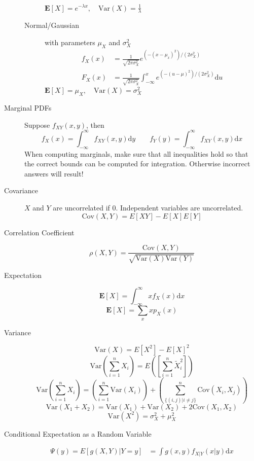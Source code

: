 \documentclass[8pt]{article}
\newcommand{\dd}[1]{\mathrm{d}{#1}}
\begin{document}
\begin{multicols}{2}
\begin{description}
\begin{description}
      $\mathbf{E}[X]=e^{-\lambda x},\quad\text{Var}(X)=\frac{1}{\lambda}$
    \item[Normal/Gaussian] with parameters $\mu_X$ and $\sigma_X^2$
      \begin{equation*}
        \begin{aligned}
          f_X(x) &=
          \frac{1}{\sqrt{2\pi\sigma_X^2}}e^{(-(x-\mu_x)^2)/(2\sigma_X^2)}
          \\
          F_X(x) &= \frac{1}{\sqrt{2\pi\sigma_X^2}} \int_{-\infty}^{x}
          e^{(-(u-\mu)^2)/(2\sigma_X^2)} \dd{u}
        \end{aligned}
    \end{equation*}
    $\mathbf{E}[X]=\mu_X,\quad\text{Var}(X)=\sigma_X^2$
  \end{description}
\item[Marginal PDFs] Suppose $f_{XY}(x,y)$, then
  $$f_X(x) = \int_{-\infty}^{\infty}f_{XY}(x,y)\dd{y} \quad\quad
  f_Y(y) = \int_{-\infty}^{\infty}f_{XY}(x,y)\dd{x}$$ When computing
  marginals, make sure that all inequalities hold so that the correct
  bounds can be computed for integration. Otherwise incorrect answers
  will result!
\item[Covariance] $X$ and $Y$ are uncorrelated if 0. Independent
  variables are uncorrelated.
  $$\text{Cov}(X,Y)=E[XY]-E[X]E[Y]$$
\item[Correlation Coefficient]
  $$\rho(X,Y)=\frac{\text{Cov}(X,Y)}{\sqrt{\text{Var}(X)\text{Var}(Y)}}$$
\item[Expectation] $$\mathbf{E}[X] = \int_{-\infty}^{\infty} x f_X(x)
  \dd{x}$$
  $$\mathbf{E}[X] = \sum_x x p_X(x)$$
\item[Variance]
  $$\text{Var}(X) = E[X^2] - E[X]^2$$
  $$\text{Var}\left(\sum_{i=1}^{n}X_i\right) =
  E\left(\left[\sum_{i=1}^{n}\tilde{X}_i^2\right]\right)$$
  $$\text{Var}\left(\sum_{i=1}^{n}X_i\right) =
  \left(\sum_{i=1}^{n}\text{Var}(X_i)\right) + \left(\sum_{\{(i,j) |
      i\not= j\}}^{n}\text{Cov}(X_i, X_j)\right)$$
  $$\text{Var}(X_1 + X_2) = \text{Var}(X_1) + \text{Var}(X_2) +
  2\text{Cov}(X_1,X_2)$$
  $$\text{Var}(X^2) = \sigma_X^2 + \mu_X^2$$
\item[Conditional Expectation as a Random Variable]
  \begin{equation*}
    \begin{aligned}
      \Psi(y) = E[g(X,Y)|Y=y] &= \int g(x,y) f_{X|Y}(x|y) \dd{x} \\

\end{aligned}
\end{equation*}
\end{description}
\end{multicols}
\end{document}
